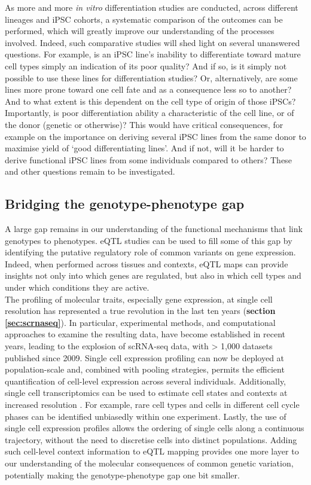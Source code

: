 As more and more \textit{in vitro} differentiation studies are conducted, across different lineages and iPSC cohorts, a systematic comparison of the outcomes can be performed, which will greatly improve our understanding of the processes involved.
Indeed, such comparative studies will shed light on several unanswered questions.
For example, is an iPSC line's inability to differentiate toward mature cell types simply an indication of its poor quality?
And if so, is it simply not possible to use these lines for differentiation studies?
Or, alternatively, are some lines more prone toward one cell fate and as a consequence less so to another?
And to what extent is this dependent on the cell type of origin of those iPSCs?
Importantly, is poor differentiation ability a characteristic of the cell line, or of the donor (genetic or otherwise)?
This would have critical consequences, for example on the importance on deriving several iPSC lines from the same donor to maximise yield of `good differentiating lines'.
And if not, will it be harder to derive functional iPSC lines from some individuals compared to others?
These and other questions remain to be investigated.

\subsection{Bridging the genotype-phenotype gap}
\label{sec:discussion_part2}

A large gap remains in our understanding of the functional mechanisms that link genotypes to phenotypes.
eQTL studies can be used to fill some of this gap by identifying the putative regulatory role of common variants on gene expression.
Indeed, when performed across tissues and contexts, eQTL maps can provide insights not only into which genes are regulated, but also in which cell types and under which conditions they are active.\\

The profiling of molecular traits, especially gene expression, at single cell resolution has represented a true revolution in the last ten years (\textbf{section \ref{sec:scrnaseq}}).
In particular, experimental methods, and computational approaches to examine the resulting data, have become established in recent years, leading to the explosion of scRNA-seq data, with > 1,000 datasets published since 2009.
Single cell expression profiling can now be deployed at population-scale and, combined with pooling strategies, permits the efficient quantification of cell-level expression across several individuals.
Additionally, single cell transcriptomics can be used to estimate cell states and contexts at increased resolution \cite{buettner2017f}.
For example, rare cell types and cells in different cell cycle phases can be identified unbiasedly within one experiment.
Lastly, the use of single cell expression profiles allows the ordering of single cells along a continuous trajectory, without the need to discretise cells into distinct populations.
Adding such cell-level context information to eQTL mapping provides one more layer to our understanding of the molecular consequences of common genetic variation, potentially making the genotype-phenotype gap one bit smaller.\\

